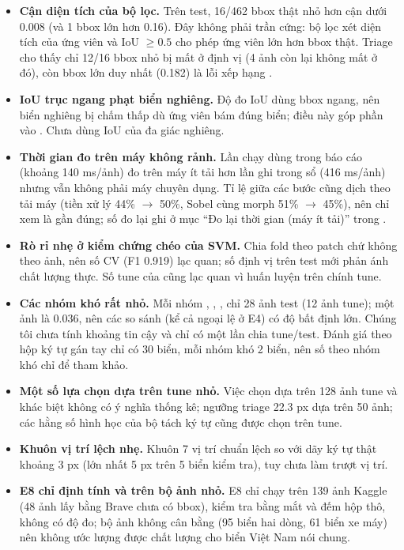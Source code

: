 \begin{itemize}
  \item \textbf{Cận diện tích của bộ lọc.} Trên test, 16/462 bbox thật nhỏ hơn cận dưới  0.008 (và 1 bbox lớn hơn 0.16). Đây không phải trần cứng: bộ lọc xét diện tích  của ứng viên và IoU $\ge 0.5$ cho phép ứng viên lớn hơn bbox thật. Triage cho thấy chỉ 12/16 bbox nhỏ bị mất ở định vị (4 ảnh còn lại không mất ở đó), còn bbox lớn duy nhất (0.182) là lỗi xếp hạng .
  \item \textbf{IoU trục ngang phạt biển nghiêng.} Độ đo IoU dùng bbox ngang, nên biển nghiêng bị chấm thấp dù ứng viên bám đúng biển; điều này góp phần vào . Chưa dùng IoU của đa giác nghiêng.
  \item \textbf{Thời gian đo trên máy không rảnh.} Lần chạy dùng trong báo cáo (khoảng 140 ms/ảnh) đo trên máy ít tải hơn lần ghi trong sổ (416 ms/ảnh) nhưng vẫn không phải máy chuyên dụng. Tỉ lệ giữa các bước cũng dịch theo tải máy (tiền xử lý 44\% $\to$ 50\%, Sobel cùng morph 51\% $\to$ 45\%), nên chỉ xem là gần đúng; số đo lại ghi ở mục ``Đo lại thời gian (máy ít tải)'' trong .
  \item \textbf{Rò rỉ nhẹ ở kiểm chứng chéo của SVM.} Chia fold theo patch chứ không theo ảnh, nên số CV (F1 0.919) lạc quan; số định vị trên test mới phản ánh chất lượng thực. Số tune của  cũng lạc quan vì huấn luyện trên chính tune.
  \item \textbf{Các nhóm khó rất nhỏ.} Mỗi nhóm , , ,  chỉ 28 ảnh test (12 ảnh tune); một ảnh là 0.036, nên các so sánh (kể cả ngoại lệ  ở E4) có độ bất định lớn. Chúng tôi chưa tính khoảng tin cậy và chỉ có một lần chia tune/test. Đánh giá theo hộp ký tự gán tay chỉ có 30 biển, mỗi nhóm khó 2 biển, nên số theo nhóm khó chỉ để tham khảo.
  \item \textbf{Một số lựa chọn dựa trên tune nhỏ.} Việc chọn  dựa trên 128 ảnh tune và khác biệt không có ý nghĩa thống kê; ngưỡng triage 22.3 px dựa trên 50 ảnh; các hằng số hình học của bộ tách ký tự cũng được chọn trên tune.
  \item \textbf{Khuôn vị trí lệch nhẹ.} Khuôn 7 vị trí chuẩn lệch so với dãy ký tự thật khoảng 3 px (lớn nhất 5 px trên 5 biển kiểm tra), tuy chưa làm trượt vị trí.
  \item \textbf{E8 chỉ định tính và trên bộ ảnh nhỏ.} E8 chỉ chạy trên 139 ảnh Kaggle (48 ảnh lấy bằng Brave chưa có bbox), kiểm tra bằng mắt và đếm hộp thô, không có độ đo; bộ ảnh không cân bằng (95 biển hai dòng, 61 biển xe máy) nên không ước lượng được chất lượng cho biển Việt Nam nói chung.
\end{itemize}

